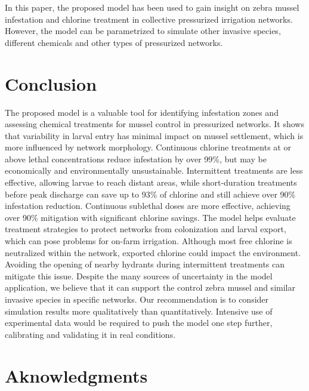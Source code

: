 \documentclass[review,authoryear]{elsarticle}
\begin{document}
In this paper, the proposed model has been used to gain insight on zebra mussel
infestation and chlorine treatment in collective pressurized irrigation
networks. However, the model can be parametrized to simulate other invasive
species, different chemicals and other types of pressurized networks.

\section{Conclusion}

The proposed model is a valuable tool for identifying infestation zones and
assessing chemical treatments for mussel control in pressurized networks. It
shows that variability in larval entry has minimal impact on mussel settlement,
which is more influenced by network morphology. Continuous chlorine treatments
at or above lethal concentrations reduce infestation by over 99\%, but may be
economically and environmentally unsustainable. Intermittent treatments are less
effective, allowing larvae to reach distant areas, while short-duration
treatments before peak discharge can save up to 93\% of chlorine and still
achieve over 90\% infestation reduction. Continuous sublethal doses are more
effective, achieving over 90\% mitigation with significant chlorine savings. The
model helps evaluate treatment strategies to protect networks from colonization
and larval export, which can pose problems for on-farm irrigation. Although most
free chlorine is neutralized within the network, exported chlorine could impact
the environment. Avoiding the opening of nearby hydrants during intermittent
treatments can mitigate this issue. Despite the many sources of uncertainty in
the model application, we believe that it can support the control zebra mussel
and similar invasive species in specific networks. Our recommendation is to
consider simulation results more qualitatively than quantitatively. Intensive
use of experimental data would be required to push the model one step further,
calibrating and validating it in real conditions.

\section*{Aknowledgments}
\end{document}

